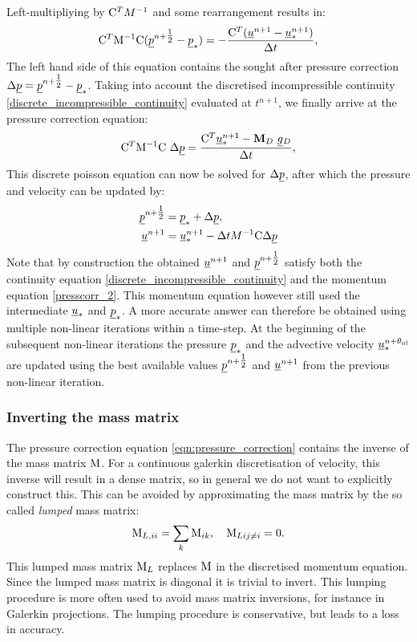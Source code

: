 Left-multipliying by $\mathrm{C}^TM^{-1}$ and 
some rearrangement results in:
\begin{equation*}
  \mathrm{C}^T \mathrm{M^{-1}}\mathrm{C} ( \underline{p}^{n+\tfrac 12} -  \underline{p}_*)
  =-\frac{\mathrm{C}^T  ({\underline{u}^{n+1}-\underline{u}_*^{n+1}})}{\Delta t},
\end{equation*}
The left hand side of this equation contains the sought after pressure 
correction $\Delta\underline{p}=\underline{p}^{n+\tfrac 12}-\underline{p}_*$. 
Taking into account the discretised incompressible continuity 
\eqref{discrete_incompressible_continuity} evaluated at 
$t^{n+1}$, we finally arrive at the pressure correction equation:
\begin{equation}
 \mathrm{C}^T \mathrm{M^{-1}}\mathrm{C}~\Delta\underline{p}
   =\frac{ \mathrm{C}^T \underline{u}_*^{n+1}-{\mbox{\boldmath$\mathrm{M}$}}_D ~\underline{g}{}_D}{\Delta t},
   \label{eqn:pressure_correction}
\end{equation}
This discrete poisson equation can now be solved 
for $\Delta\underline{p}$, after which the pressure and velocity can 
be updated by:
\begin{equation*}
\begin{split}
  \underline{p}^{n+\tfrac 12} &= \underline{p}_* + \Delta\underline{p}, \\
  \underline{u}^{n+1} &= \underline{u}_*^{n+1}
  -\Delta t  M^{-1} \mathrm{C} \Delta\underline{p}
\end{split}
\end{equation*}
Note that by construction the obtained $\underline{u}^{n+1}$ and 
$\underline{p}^{n+\tfrac 12}$ satisfy both the continuity equation
\eqref{discrete_incompressible_continuity} and the momentum equation
\eqref{presscorr_2}. This momentum equation however still used
the intermediate $\underline{u}_*$ and $\underline{p}_*$.
A more accurate answer can therefore 
be obtained using multiple non-linear iterations within a 
time-step. At the beginning of the subsequent non-linear iterations
the pressure $\underline{p}_*$ and the advective velocity 
$\underline{u}_*^{n+\theta_{\mathrm{nl}}}$ are updated using the best available values
$\underline{p}^{n+\tfrac 12}$ and $\underline{u}^{n+1}$ from the previous 
non-linear iteration.

\subsubsection{Inverting the mass matrix}
\label{Sect:ND_cg_mass_lumping}
The pressure correction equation \eqref{eqn:pressure_correction} contains
the inverse of the mass matrix $\mathrm{M}$. For a continuous galerkin
discretisation of velocity, this inverse will result in a dense 
matrix, so in general we do not want to explicitly construct 
this. This can be avoided by approximating the mass matrix by the 
so called \emph{lumped} mass matrix:
\begin{equation*}
  \mathrm{M}_{L,ii}=\sum_k \mathrm{M}_{ik},\quad \mathrm{M}_{Lij\neq i}=0.
\end{equation*}
This lumped mass matrix $\mathrm{M}_L$ replaces $\mathrm{M}$ in the 
discretised momentum equation. Since the lumped mass matrix is 
diagonal it is trivial to invert. This lumping procedure is more 
often used to avoid mass matrix inversions, for instance in 
Galerkin projections. The lumping procedure is conservative, 
but leads to a loss in accuracy.

